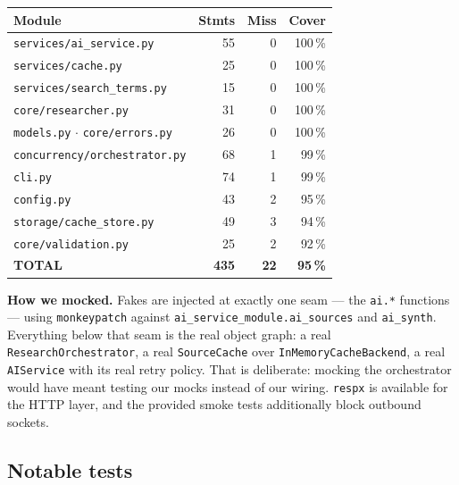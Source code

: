 \documentclass[11pt,a4paper]{article}
\begin{document}
\vspace{0.4em}
\begin{center}\small
\begin{tabular}{lrrr}
\toprule
\textbf{Module} & \textbf{Stmts} & \textbf{Miss} & \textbf{Cover} \\
\midrule
\texttt{services/ai\_service.py}        & 55 & 0 & 100\,\% \\
\texttt{services/cache.py}              & 25 & 0 & 100\,\% \\
\texttt{services/search\_terms.py}      & 15 & 0 & 100\,\% \\
\texttt{core/researcher.py}             & 31 & 0 & 100\,\% \\
\texttt{models.py} $\cdot$ \texttt{core/errors.py} & 26 & 0 & 100\,\% \\
\texttt{concurrency/orchestrator.py}    & 68 & 1 & 99\,\% \\
\texttt{cli.py}                         & 74 & 1 & 99\,\% \\
\texttt{config.py}                      & 43 & 2 & 95\,\% \\
\texttt{storage/cache\_store.py}        & 49 & 3 & 94\,\% \\
\texttt{core/validation.py}             & 25 & 2 & 92\,\% \\
\midrule
\textbf{TOTAL}                          & \textbf{435} & \textbf{22} & \textbf{95\,\%} \\
\bottomrule
\end{tabular}
\end{center}

\vspace{0.4em}
\textbf{How we mocked.} Fakes are injected at exactly one seam --- the \texttt{ai.*} functions ---
using \texttt{monkeypatch} against \texttt{ai\_service\_module.ai\_sources} and \texttt{ai\_synth}.
Everything below that seam is the real object graph: a real \texttt{ResearchOrchestrator}, a real
\texttt{SourceCache} over \texttt{InMemoryCacheBackend}, a real \texttt{AIService} with its real
retry policy. That is deliberate: mocking the orchestrator would have meant testing our mocks
instead of our wiring. \texttt{respx} is available for the HTTP layer, and the provided smoke tests
additionally block outbound sockets.

\subsection{Notable tests}
\end{document}
